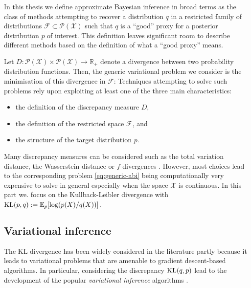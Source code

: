 
In this thesis we define approximate Bayesian inference in broad terms as the class of methods attempting to recover a distribution $q$ in a restricted family of distributions $\mathcal F\subset \mathcal P(\mathcal X)$ such that $q$ is a ``good'' proxy for a posterior distribution $p$ of interest. 
This definition leaves significant room to describe different methods based on the definition of what a ``good proxy'' means. 

Let $D:\mathcal P(\mathcal X)\times \mathcal P(\mathcal X)\to \mathbb R_{+}$ denote a divergence between two probability distribution functions. Then, the generic variational problem we consider is the minimisation of this divergence in $\mathcal F$:
%
%
Techniques attempting to solve such problems rely upon exploiting at least one of the three main characteristics: 
\begin{itemize}\itsepa
\item the definition of the discrepancy measure $D$, 
\item the definition of the restricted space $\mathcal F$, and
\item the structure of the target distribution $p$. 
\end{itemize}
Many discrepancy measures can be considered such as the total variation distance, the Wasserstein distance or $f$-divergences \citep{minka04, blei16, li16, bernton17}. However, most choices lead to the corresponding problem \eqref{eq:generic-abi} being computationally very expensive to solve in general especially when the space $\mathcal X$ is continuous. In this part we. focus on the Kullback-Leibler divergence \citep{kullback51} with $\mathrm{KL}\!\left(p,q\right):=\mathbb E_{p}[\log (p(X)/q(X))]$.

\subsection{Variational inference}
The KL divergence has been widely considered in the literature partly because it leads to variational problems that are amenable to gradient descent-based algorithms. 
In particular, considering the discrepancy $\mathrm{KL}\!\left(q,p\right)$ lead to the development of the popular \emph{variational inference} algorithms \citep{hoffman13,blei16}. 


